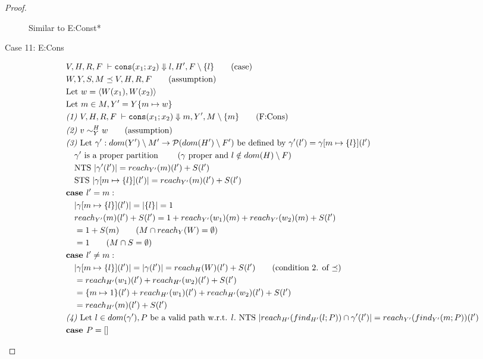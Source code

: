 \documentclass{easychair}
\newcommand{\veq}[4]{#3 \sim^{#1}_{#2} #4}
\theoremstyle{definition}
\begin{document}
\begin{proof}
\begin{description}
  Similar to E:Const*
  \item[Case 11: E:Cons]
  \begin{align*}
		&V,H,R,F \; \vdash \consexcst{x_1}{x_2} \Downarrow l,H' ,F \setminus \{l\} \tag{case}\\
		&W,Y,S,M \preceq V,H,R,F \tag{assumption}\\
		&\text{Let } w = \pairexcst{W(x_1)}{W(x_2)}\\
		&\text{Let } m \in M, Y' = Y\{m \mapsto w\}\\
		&\emph{(1) }V,H,R,F \; \vdash
			\consexcst{x_1}{x_2} \Downarrow m,Y' ,M \setminus \{m\} \tag{F:Cons}\\
		&\emph{(2) } \veq{H}{Y}{v}{w} \tag{assumption}\\
		&\emph{(3) } \text{Let } \gamma' : dom(Y') \setminus M' \to \mathcal{P}(dom(H')\setminus F')
			\text{ be defined by } \gamma'(l') = \gamma[m \mapsto \{l\}](l')\\
		&\quad \gamma' \text{ is a proper partition } 
			\tag{$\gamma$ proper and $l \notin dom(H) \setminus F$}\\
		&\quad \text{NTS } |\gamma'(l')| = reach_{Y'}(m)(l') + S(l')\\
		&\quad \text{STS } |\gamma[m \mapsto \{l\}](l')| = 
			reach_{Y'}(m)(l') + S(l')\\
		&\textbf{case } l' = m:\\
		&\quad |\gamma[m \mapsto \{l\}](l')| = |\{l\}| = 1\\
		&\quad 	reach_{Y'}(m)(l') + S(l') = 1 + reach_{Y'}(w_1)(m) + reach_{Y'}(w_2)(m) + S(l')\\
		&\quad = 1 + S(m) \tag{$M \cap reach_{Y}(W) = \emptyset$}\\
		&\quad = 1 \tag{$M \cap S = \emptyset$}\\
		&\textbf{case } l' \ne m:\\
		&\quad |\gamma[m \mapsto \{l\}](l')| = |\gamma(l')| = reach_H(W)(l') + S(l') 
			\tag{condition 2. of $\preceq$}\\
		&\quad = reach_{H'}(w_1)(l') + reach_{H'}(w_2)(l') + S(l')\\
		&\quad = \{m \mapsto 1\}(l') + reach_{H'}(w_1)(l') + reach_{H'}(w_2)(l') + S(l')\\
		&\quad = reach_{H'}(m)(l') + S(l')\\
		&\emph{(4) } \text{Let } l \in dom(\gamma'), P \text{ be a valid path w.r.t. } l. \text{ NTS }
		|reach_{H'}(find_{H'}(l;P)) \cap \gamma'(l')| = 
				reach_{Y'}(find_{Y'}(m;P))(l')\\
		&\textbf{case } P = []\\

\end{align*}
\end{description}
\end{proof}
\end{document}
